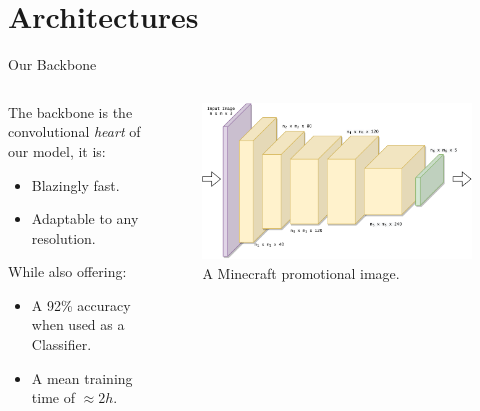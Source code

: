 \documentclass[english]{beamer}
\begin{document}
\section{Architectures}
\begin{frame}{Our Backbone}
  \begin{columns}
    
    \begin{column}{0.5\textwidth}
      The backbone is the convolutional \emph{heart} of our model, it is:
      \begin{itemize}
        \item Blazingly fast.
        \item Adaptable to any resolution.
      \end{itemize}
      While also offering:
      \begin{itemize}
        \item A 92\% accuracy when used as a Classifier.
        \item A mean training time of $\approx2h$.
      \end{itemize}
    \end{column}

    \begin{column}{0.5\textwidth}
      \begin{figure}
        \centering
            \includegraphics[width=1.0\textwidth]{images/backbone.pdf}
            \caption{A Minecraft promotional image.}
        \end{figure}
    \end{column}

  \end{columns}
\end{frame}
\end{document}
